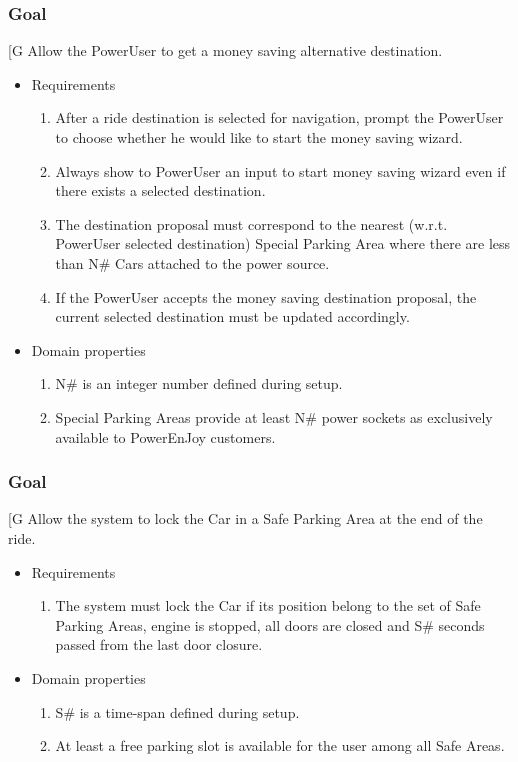     \subsubsection{Goal }
    {[}G\arabic{goalctr}{]}
    Allow the PowerUser to get a money saving alternative destination.
    \begin{itemize}
        \item Requirements
        \begin{enumerate}[REQ]
    			\item After a ride destination is selected for navigation, prompt the PowerUser to choose whether he would like to start the money saving wizard.
    			\item Always show to PowerUser an input to start money saving wizard even if there exists a selected destination.
    			\item The destination proposal must correspond to the nearest (w.r.t. PowerUser selected destination) Special Parking Area where there are less than N\# Cars attached to the power source.
    			\item If the PowerUser accepts the money saving destination proposal, the current selected destination must be updated accordingly.
        \end{enumerate}
        \item Domain properties
        \begin{enumerate}[PRO]
                \item N\# is an integer number defined during setup.
    			\item Special Parking Areas provide at least N\# power sockets as exclusively available to PowerEnJoy customers.
        \end{enumerate}
    \end{itemize}
 
    \subsubsection{Goal }
    {[}G\arabic{goalctr}{]}
    Allow the system to lock the Car in a Safe Parking Area at the end of the ride.
    \begin{itemize}
        \item Requirements
        \begin{enumerate}[REQ]
    			\item The system must lock the Car if its position belong to the set of Safe Parking Areas, engine is stopped, all doors are closed and S\# seconds passed from the last door closure.
        \end{enumerate}
        \item Domain properties
        \begin{enumerate}[PRO]
                \item S\# is a time-span defined during setup.
    			\item At least a free parking slot is available for the user among all Safe Areas.
        \end{enumerate}
    \end{itemize} 
 
